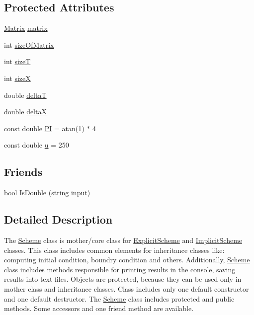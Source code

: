 \subsection*{Protected Attributes}
\begin{DoxyCompactItemize}
\item 
\mbox{\hyperlink{class_matrix}{Matrix}} \mbox{\hyperlink{class_scheme_a0e1fb8cb7e062d3f49715445a884f0e8}{matrix}}
\item 
int \mbox{\hyperlink{class_scheme_aaa37febfb3b695d7637210b6ffdcd9ad}{size\+Of\+Matrix}}
\item 
int \mbox{\hyperlink{class_scheme_a04f4e41aaa2bffd82b9027550f8374f0}{sizeT}}
\item 
int \mbox{\hyperlink{class_scheme_a34d6e438fa45638221f250c9aa7acde1}{sizeX}}
\item 
double \mbox{\hyperlink{class_scheme_aaaf978f98d30bd96ea56a9387d1b2c5a}{deltaT}}
\item 
double \mbox{\hyperlink{class_scheme_a7491f0ce42370ab44134bf82bd0079a7}{deltaX}}
\item 
const double \mbox{\hyperlink{class_scheme_a1a21e7fac3843f2d64c49597c668ce56}{PI}} = atan(1) $\ast$ 4
\item 
const double \mbox{\hyperlink{class_scheme_a512873bf3cd534832300046f1a1792a3}{u}} = 250
\end{DoxyCompactItemize}
\subsection*{Friends}
\begin{DoxyCompactItemize}
\item 
bool \mbox{\hyperlink{class_scheme_ad9aa7a2eac63a3a91e6efc3d8a8093cd}{Is\+Double}} (string input)
\end{DoxyCompactItemize}


\subsection{Detailed Description}
The \mbox{\hyperlink{class_scheme}{Scheme}} class is mother/core class for \mbox{\hyperlink{class_explicit_scheme}{Explicit\+Scheme}} and \mbox{\hyperlink{class_implicit_scheme}{Implicit\+Scheme}} classes. This class includes common elements for inheritance classes like\+: computing initial condition, boundry condition and others. Additionally, \mbox{\hyperlink{class_scheme}{Scheme}} class includes methods responsible for printing results in the console, saving results into text files. Objects are protected, because they can be used only in mother class and inheritance classes. Class includes only one default constructor and one default destructor. The \mbox{\hyperlink{class_scheme}{Scheme}} class includes protected and public methods. Some accessors and one friend method are available. 

